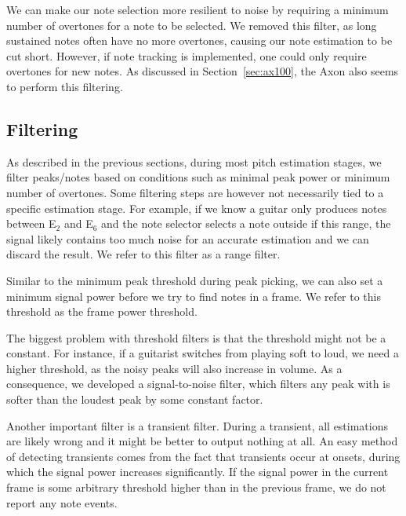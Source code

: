 \documentclass[a4paper,10pt,twocolumn]{article}
\newcommand{\note}[2]{#1${}_{#2}$}
\begin{document}
We can make our note selection more resilient to noise by requiring a minimum number of overtones for a note to be selected. We removed this filter, as long sustained notes often have no more overtones, causing our note estimation to be cut short. However, if note tracking is implemented, one could only require overtones for new notes. As discussed in Section~\ref{sec:ax100}, the Axon also seems to perform this filtering. %



\subsection{Filtering}
As described in the previous sections, during most pitch estimation stages, we filter peaks/notes based on conditions such as minimal peak power or minimum number of overtones. Some filtering steps are however not necessarily tied to a specific estimation stage. For example, if we know a guitar only produces notes between \note{E}{2} and \note{E}{6} and the note selector selects a note outside if this range, the signal likely contains too much noise for an accurate estimation and we can discard the result. We refer to this filter as a range filter.

Similar to the minimum peak threshold during peak picking, we can also set a minimum signal power before we try to find notes in a frame. We refer to this threshold as the frame power threshold.

The biggest problem with threshold filters is that the threshold might not be a constant. For instance, if a guitarist switches from playing soft to loud, we need a higher threshold, as the noisy peaks will also increase in volume. As a consequence, we developed a signal-to-noise filter, which filters any peak with is softer than the loudest peak by some constant factor.

Another important filter is a transient filter. During a transient, all estimations are likely wrong and it might be better to output nothing at all. An easy method of detecting transients comes from the fact that transients occur at onsets, during which the signal power increases significantly. If the signal power in the current frame is some arbitrary threshold higher than in the previous frame, we do not report any note events.
\end{document}
